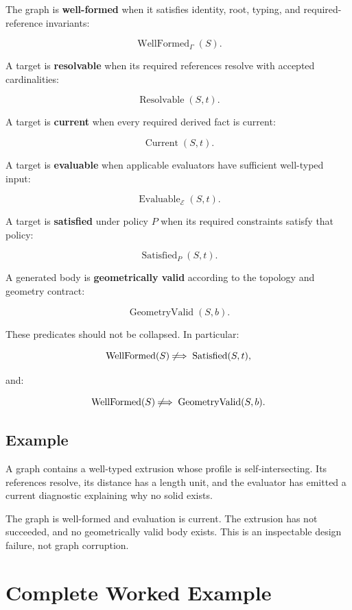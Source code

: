 \documentclass[11pt]{article}
\begin{document}
The graph is \textbf{well-formed} when it satisfies identity, root, typing, and
required-reference invariants:

\[
\operatorname{WellFormed}_{\Gamma}(S).
\]

A target is \textbf{resolvable} when its required references resolve with
accepted cardinalities:

\[
\operatorname{Resolvable}(S,t).
\]

A target is \textbf{current} when every required derived fact is current:

\[
\operatorname{Current}(S,t).
\]

A target is \textbf{evaluable} when applicable evaluators have sufficient
well-typed input:

\[
\operatorname{Evaluable}_{\mathcal{E}}(S,t).
\]

A target is \textbf{satisfied} under policy $P$ when its required constraints
satisfy that policy:

\[
\operatorname{Satisfied}_{P}(S,t).
\]

A generated body is \textbf{geometrically valid} according to the topology and
geometry contract:

\[
\operatorname{GeometryValid}(S,b).
\]

These predicates should not be collapsed. In particular:

\[
\operatorname{WellFormed}(S)
\not\!\!\implies
\operatorname{Satisfied}(S,t),
\]

and:

\[
\operatorname{WellFormed}(S)
\not\!\!\implies
\operatorname{GeometryValid}(S,b).
\]

\subsection{Example}

A graph contains a well-typed extrusion whose profile is self-intersecting. Its
references resolve, its distance has a length unit, and the evaluator has
emitted a current diagnostic explaining why no solid exists.

The graph is well-formed and evaluation is current. The extrusion has not
succeeded, and no geometrically valid body exists. This is an inspectable design
failure, not graph corruption.

\section{Complete Worked Example}
\end{document}
